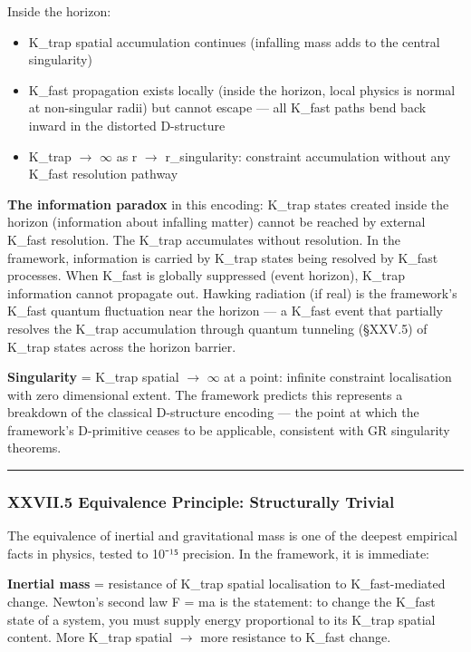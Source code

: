 \documentclass[12pt,a4paper]{article}
\begin{document}
Inside the horizon:

\begin{itemize}
    \item K\_trap spatial accumulation continues (infalling mass adds to the central singularity)
    \item K\_fast propagation exists locally (inside the horizon, local physics is normal at non-singular radii) but cannot escape --- all K\_fast paths bend back inward in the distorted D-structure
    \item K\_trap $\rightarrow$ $\infty$ as r $\rightarrow$ r\_singularity: constraint accumulation without any K\_fast resolution pathway
\end{itemize}

\textbf{The information paradox} in this encoding: K\_trap states created inside the horizon (information about infalling matter) cannot be reached by external K\_fast resolution. The K\_trap accumulates without resolution. In the framework, information is carried by K\_trap states being resolved by K\_fast processes. When K\_fast is globally suppressed (event horizon), K\_trap information cannot propagate out. Hawking radiation (if real) is the framework's K\_fast quantum fluctuation near the horizon --- a K\_fast event that partially resolves the K\_trap accumulation through quantum tunneling (§XXV.5) of K\_trap states across the horizon barrier.

\textbf{Singularity} = K\_trap spatial $\rightarrow$ $\infty$ at a point: infinite constraint localisation with zero dimensional extent. The framework predicts this represents a breakdown of the classical D-structure encoding --- the point at which the framework's D-primitive ceases to be applicable, consistent with GR singularity theorems.

\begin{center}
\rule{0.5\textwidth}{0.4pt}
\end{center}

\subsubsection{XXVII.5 Equivalence Principle: Structurally Trivial}

The equivalence of inertial and gravitational mass is one of the deepest empirical facts in physics, tested to 10⁻¹⁵ precision. In the framework, it is immediate:

\textbf{Inertial mass} = resistance of K\_trap spatial localisation to K\_fast-mediated change. Newton's second law F = ma is the statement: to change the K\_fast state of a system, you must supply energy proportional to its K\_trap spatial content. More K\_trap spatial $\rightarrow$ more resistance to K\_fast change.
\end{document}
